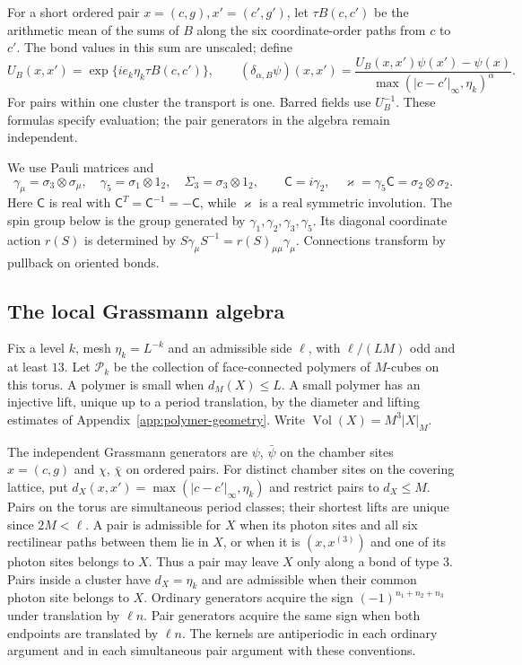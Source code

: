 For a short ordered pair \(x=(c,g),x'=(c',g')\), let
\(\tau B(c,c')\) be the arithmetic mean of the sums of \(B\)
along the six coordinate-order paths from \(c\) to \(c'\).
The bond values in this sum are unscaled; define
\[
 U_B(x,x')=\exp\{ie_k\eta_k\tau B(c,c')\},\qquad
 (\delta_{\alpha,B}\psi)(x,x')
       =\frac{U_B(x,x')\psi(x')-\psi(x)}
                    {\max(|c-c'|_\infty,\eta_k)^\alpha}.
\]
For pairs within one cluster the transport is one. Barred fields
use \(U_B^{-1}\). These formulas specify evaluation; the pair
generators in the algebra remain independent.

We use Pauli matrices and
\[
 \gamma_\mu=\sigma_3\otimes\sigma_\mu,\quad
 \gamma_5=\sigma_1\otimes1_2,\quad \Sigma_3=\sigma_3\otimes1_2,
 \qquad
 \mathsf C=i\gamma_2,\quad
 \varkappa=\gamma_5\mathsf C=\sigma_2\otimes\sigma_2 .
\]
Here \(\mathsf C\) is real with
\(\mathsf C^T=\mathsf C^{-1}=-\mathsf C\), while
\(\varkappa\) is a real symmetric involution. The spin group below
is the group generated by \(\gamma_1,\gamma_2,\gamma_3,\gamma_5\).
Its diagonal coordinate action \(r(S)\) is determined by
\(S\gamma_\mu S^{-1}=r(S)_{\mu\mu}\gamma_\mu\).
Connections transform by pullback on oriented bonds.

\subsection{The local Grassmann algebra}
\label{subsec:rg-activity-spaces}

Fix a level $k$, mesh $\eta_k=L^{-k}$ and an admissible side
$\ell$, with $\ell/(LM)$ odd and at least $13$.
Let $\mathcal P_k$ be the collection of face-connected polymers
of $M$-cubes on this torus. A polymer is small when
$d_M(X)\le L$. A small polymer has an injective lift, unique up
to a period translation, by the diameter and lifting estimates
of Appendix~\ref{app:polymer-geometry}.
Write $\operatorname{Vol}(X)=M^3|X|_M$.

The independent Grassmann generators are $\psi$, $\bar\psi$ on
the chamber sites $x=(c,g)$ and $\chi$, $\bar\chi$ on ordered
pairs. For distinct chamber sites on the covering lattice, put
$d_X(x,x')=\max(|c-c'|_\infty,\eta_k)$ and restrict pairs to
$d_X\le M$. Pairs on the torus are simultaneous period classes;
their shortest lifts are unique since $2M<\ell$. A pair is
admissible for $X$ when its photon sites and all six rectilinear
paths between them lie in $X$, or when it is $(x,x^{(3)})$ and
one of its photon sites belongs to $X$.
Thus a pair may leave $X$ only along a bond of type $3$.
Pairs inside a cluster have $d_X=\eta_k$ and are admissible when
their common photon site belongs to $X$.
Ordinary generators acquire the sign $(-1)^{n_1+n_2+n_3}$
under translation by $\ell n$. Pair generators acquire the same
sign when both endpoints are translated by $\ell n$.
The kernels are antiperiodic in each ordinary argument and in
each simultaneous pair argument with these conventions.

